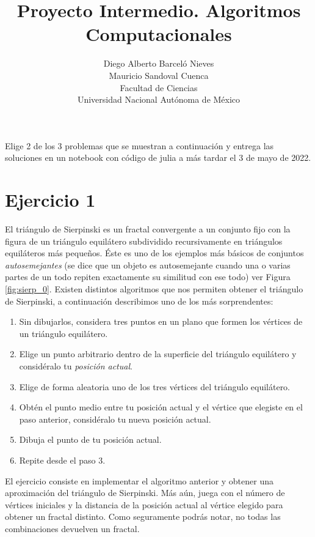\documentclass[a4paper]{article}
\begin{document}
\title{Proyecto Intermedio. Algoritmos Computacionales}
\author{Diego Alberto Barceló Nieves  \\ Mauricio Sandoval Cuenca \\ Facultad de Ciencias \\ Universidad Nacional Autónoma de México}
\date{}
\maketitle

Elige 2 de los 3 problemas que se muestran a continuación y entrega las soluciones en un notebook con código de julia a más tardar el 3 de mayo de 2022. 


\section*{Ejercicio 1} \label{Sec: Ejercicio 1}

El triángulo de Sierpinski es un fractal convergente a un conjunto fijo con la figura de un triángulo equilátero subdividido recursivamente en triángulos equiláteros más pequeños. Éste es uno de los ejemplos más básicos de conjuntos \textit{autosemejantes} (se dice que un objeto es autosemejante cuando una o varias partes de un todo repiten exactamente su similitud con ese todo) ver Figura \ref{fig:sierp_0}. Existen distintos algoritmos que nos permiten obtener el triángulo de Sierpinski, a continuación describimos uno de los más sorprendentes:

\begin{enumerate}
    \item Sin dibujarlos, considera tres puntos en un plano que formen los vértices de un triángulo equilátero.
    \item Elige un punto arbitrario dentro de la superficie del triángulo equilátero y considéralo tu \textit{posición actual}.
    \item Elige de forma aleatoria uno de los tres vértices del triángulo equilátero.
    \item Obtén el punto medio entre tu posición actual y el vértice que elegiste en el paso anterior, considéralo tu nueva posición actual.
    \item Dibuja el punto de tu posición actual.
    \item Repite desde el paso 3.
\end{enumerate}

El ejercicio consiste en implementar el algoritmo anterior y obtener una aproximación del triángulo de Sierpinski. Más aún, juega con el número de vértices iniciales y la distancia de la posición actual al vértice elegido para obtener un fractal distinto. Como seguramente podrás notar, no todas las combinaciones devuelven un fractal.
\end{document}
